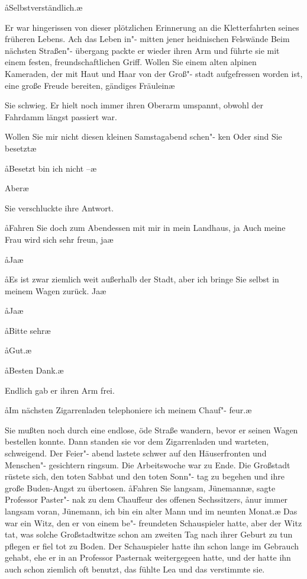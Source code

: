 \aa{}Selbstverständlich.\ae{}

Er war hingerissen von dieser plötzlichen Erinnerung an die
Kletterfahrten seines früheren Lebens. Ach das Leben in"-%
mitten jener heidnischen Felswände\ausr{} Beim nächsten Straßen"-%
übergang packte er wieder ihren Arm und führte sie mit einem
festen, freundschaftlichen Griff. \aanah{}Wollen Sie einem alten
alpinen Kameraden, der mit Haut und Haar von der Groß"-%
stadt aufgefressen worden ist, eine große Freude bereiten,
gändiges Fräulein\frag{}\ae{}

Sie schwieg. Er hielt noch immer ihren Oberarm umspannt,
obwohl der Fahrdamm längst passiert war.

\aanah{}Wollen Sie mir nicht diesen kleinen Samstagabend schen"-%
ken\frag{} Oder sind Sie besetzt\frag{}\ae{}

\aa{}Besetzt bin ich nicht --\ae{}

\aanah{}Aber\frag{}\ae{}

Sie verschluckte ihre Antwort.

\aa{}Fahren Sie doch zum Abendessen mit mir in mein Landhaus,
ja\frag{} Auch meine Frau wird sich sehr freun, ja\frag{}\ae{}

\aa{}Ja\frag{}\ae{}

\aa{}Es ist zwar ziemlich weit außerhalb der Stadt, aber ich bringe
Sie selbst in meinem Wagen zurück. Ja\frag{}\ae{}

\aa{}Ja\frag{}\ae{}

\aa{}Bitte sehr\ausr{}\ae{}

\aa{}Gut.\ae{}

\aa{}Besten Dank.\ae{}

Endlich gab er ihren Arm frei.

\aa{}Im nächsten Zigarrenladen telephoniere ich meinem Chauf"-%
feur.\ae{}

Sie mußten noch durch eine endlose, öde Straße wandern,
bevor er seinen Wagen bestellen konnte. Dann standen sie
vor dem Zigarrenladen und warteten, schweigend. Der Feier"-%
abend lastete schwer auf den Häuserfronten und Menschen"-%
gesichtern ringsum. Die Arbeitswoche war zu Ende. Die
Großstadt rüstete sich, den toten Sabbat und den toten Sonn"-%
tag zu begehen und ihre große Buden-Angst zu übertosen.
\abstand{}
\aa{}Fahren Sie langsam, Jünemann\ae{},\eingriff{eS74-1}{Jünemann\ae{}, ] Jünemann,\ae{}} sagte Professor Paster"-%
nak zu dem Chauffeur des offenen Sechssitzers, \aa{}nur immer
langsam voran, Jünemann, ich bin ein alter Mann und im
neunten Monat.\ae{} Das war ein Witz, den er von einem be"-%
freundeten Schauspieler hatte, aber der Witz tat, was solche
Großstadtwitze schon am zweiten Tag nach ihrer Geburt zu
tun pflegen\dopp{} er fiel tot zu Boden. Der Schauspieler hatte ihn
schon lange im Gebrauch gehabt, ehe er in an Professor
Pasternak weitergegeen hatte, und der hatte ihn auch schon
ziemlich oft benutzt, das fühlte Lea und das verstimmte sie.


